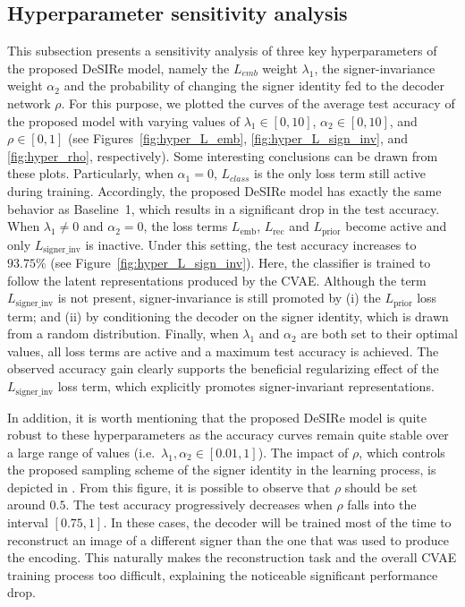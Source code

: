 \subsection{Hyperparameter sensitivity analysis}
\label{sec:desire_hyperparam}
This subsection presents a sensitivity analysis of three key hyperparameters of the proposed DeSIRe model, namely the $L_{emb}$ weight $\lambda_{1}$, the signer-invariance weight $\alpha_{2}$ and the probability of changing the signer identity fed to the decoder network $\rho$. For this purpose, we plotted the curves of the average test accuracy of the proposed model with varying values of $\lambda_{1}\in[0,10]$,  $\alpha_{2}\in[0,10]$, and $\rho\in[0,1]$ (see Figures~\ref{fig:hyper_L_emb}, \ref{fig:hyper_L_sign_inv}, and \ref{fig:hyper_rho}, respectively). Some interesting conclusions can be drawn from these plots. Particularly, when $\alpha_{1}=0$, $L_{class}$ is the only loss term still active during training. Accordingly, the proposed DeSIRe model has exactly the same behavior as Baseline~1, which results in a significant drop in the test accuracy. When $\lambda_{1}\neq 0$ and $\alpha_{2}=0$, the loss terms $L_{\text{emb}}$, $L_{\text{rec}}$ and $L_{\text{prior}}$ become active and only $L_{\text{signer\_inv}}$ is inactive. Under this setting, the test accuracy increases to $93.75\%$ (see Figure~\ref{fig:hyper_L_sign_inv}). Here, the classifier is trained to follow the latent representations produced by the CVAE. Although the term $L_{\text{signer\_inv}}$ is not present, signer-invariance is still promoted by (i) the $L_{\text{prior}}$ loss term; and (ii) by conditioning the decoder on the signer identity, which is drawn from a random distribution. Finally, when $\lambda_1$ and $\alpha_2$ are both set to their optimal values, all loss terms are active and a maximum test accuracy is achieved. The observed accuracy gain clearly supports the beneficial regularizing effect of the $L_{\text{signer\_inv}}$ loss term, which explicitly promotes signer-invariant representations.

In addition, it is worth mentioning that the proposed DeSIRe model is quite robust to these hyperparameters as the accuracy curves remain quite stable over a large range of values (i.e.\ $\lambda_{1},\alpha_{2}\in [0.01, 1]$). The impact of $\rho$, which controls the proposed sampling scheme of the signer identity in the learning process, is depicted in . From this figure, it is possible to observe that $\rho$ should be set around $0.5$. The test accuracy progressively decreases when $\rho$ falls into the interval $[0.75, 1]$. In these cases, the decoder will be trained most of the time to reconstruct an image of a different signer than the one that was used to produce the encoding. This naturally makes the reconstruction task and the overall CVAE training process too difficult, explaining the noticeable significant performance drop.
